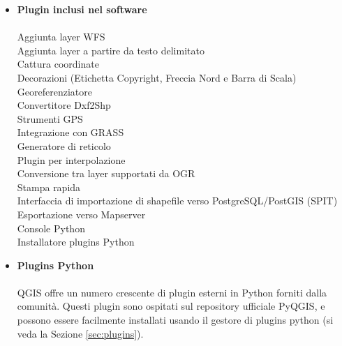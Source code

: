 \begin{itemize}
\item \textbf{Plugin inclusi nel software}
\\ \\ Aggiunta layer WFS
\\ Aggiunta layer a partire da testo delimitato
\\ Cattura coordinate
\\ Decorazioni (Etichetta Copyright, Freccia Nord e Barra di Scala)
\\ Georeferenziatore
\\ Convertitore Dxf2Shp
\\ Strumenti GPS
\\ Integrazione con GRASS
\\ Generatore di reticolo
\\ Plugin per interpolazione
\\ Conversione tra layer supportati da OGR
\\ Stampa rapida
\\ Interfaccia di importazione di shapefile verso PostgreSQL/PostGIS (SPIT)
\\ Esportazione verso Mapserver
\\ Console Python
\\ Installatore plugins Python
\\ \item \textbf{Plugins Python}
\\ \\ QGIS offre un numero crescente di plugin esterni in Python forniti
dalla comunità. Questi plugin sono ospitati sul repository ufficiale
PyQGIS, e possono essere facilmente installati usando il gestore di
plugins python (si veda la Sezione \ref{sec:plugins}).
\end{itemize}

